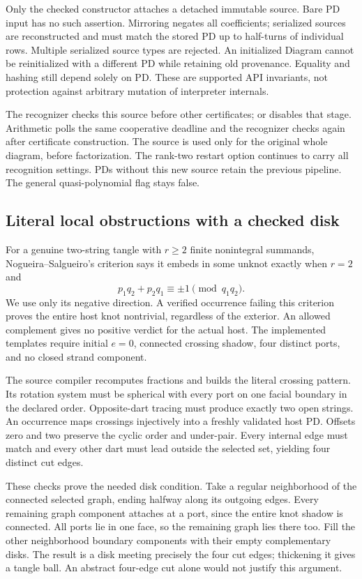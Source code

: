 Only the checked constructor attaches a detached immutable source.  Bare
PD input has no such assertion.  Mirroring negates all coefficients;
serialized sources are reconstructed and must match the stored PD up to
half-turns of individual rows.  Multiple serialized source types are rejected.
An initialized Diagram cannot be reinitialized with a different PD while
retaining old provenance.  Equality and hashing still depend solely on PD.
These are supported API invariants, not protection against arbitrary mutation
of interpreter internals.

The recognizer checks this source before other certificates;
 or  disables that stage.
Arithmetic polls the same cooperative deadline and the recognizer checks
again after certificate construction.  The source is used only for the
original whole diagram, before factorization.  The rank-two restart option
continues to carry all recognition settings.  PDs without this new source
retain the previous pipeline.  The general quasi-polynomial flag stays false.

\subsection{Literal local obstructions with a checked disk}
For a genuine two-string tangle with $r\ge2$ finite nonintegral summands,
Nogueira--Salgueiro's criterion says it embeds in some unknot exactly when
$r=2$ and
\[
 p_1q_2+p_2q_1\equiv\pm1\pmod{q_1q_2}.
\]
We use only its negative direction.  A verified occurrence failing this
criterion proves the entire host knot nontrivial, regardless of the exterior.
An allowed complement gives no positive verdict for the actual host.
The implemented templates require initial $e=0$, connected crossing shadow,
four distinct ports, and no closed strand component.

The source compiler recomputes fractions and builds the literal crossing
pattern.  Its rotation system must be spherical with every port on one
facial boundary in the declared order.  Opposite-dart tracing must produce
exactly two open strings.  An occurrence maps crossings injectively into
a freshly validated host PD.  Offsets zero and two preserve the cyclic
order and under-pair.  Every internal edge must match and every other dart
must lead outside the selected set, yielding four distinct cut edges.

These checks prove the needed disk condition.  Take a regular neighborhood
of the connected selected graph, ending halfway along its outgoing edges.
Every remaining graph component attaches at a port, since the entire knot
shadow is connected.  All ports lie in one face, so the remaining graph lies
there too.  Fill the other neighborhood boundary components with their empty
complementary disks.  The result is a disk meeting precisely the four cut
edges; thickening it gives a tangle ball.  An abstract four-edge cut alone
would not justify this argument.

